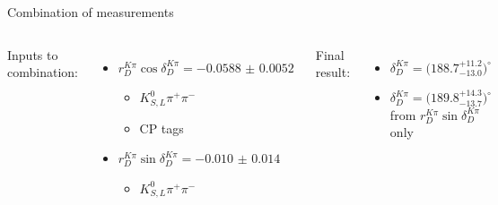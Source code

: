 \documentclass{beamer}
\begin{document}
\begin{frame}{Combination of measurements}
  \begin{columns}
    Inputs to combination:
    \vspace{0.3cm}
    \begin{itemize}
      \setlength\itemsep{2.0em}
      \item{$r_D^{K\pi}\cos\delta_D^{K\pi} = \SI{-0.0588(52)}{}$}
      \begin{itemize}
        \item{$K_{S, L}^0\pi^+\pi^-$}
        \item{CP tags}
      \end{itemize}
      \item{$r_D^{K\pi}\sin\delta_D^{K\pi} = \SI{-0.010(14)}{}$}
      \begin{itemize}
        \item{$K_{S, L}^0\pi^+\pi^-$}
      \end{itemize}
    \end{itemize}
    Final result:
    \vspace{0.3cm}
    \begin{itemize}
      \setlength\itemsep{0.5em}
      \item{$\delta_D^{K\pi} = \big(188.7^{+11.2}_{-13.0}\big)^\circ$}
      \item{$\delta_D^{K\pi} = \big(189.8^{+14.3}_{-13.7}\big)^\circ$ from $r_D^{K\pi}\sin\delta_D^{K\pi}$ only}
    \end{itemize}
    \begin{figure}
      \centering
      \includegraphics[width=\textwidth]{delta_kpi_combination.pdf}
    \end{figure}
  \end{columns}
\end{frame}
\end{document}
